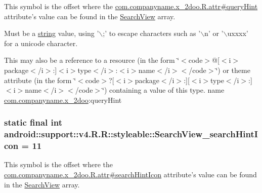 This symbol is the offset where the \hyperlink{classcom_1_1companyname_1_1x__2doo_1_1_r_1_1attr_2e0b0bcb94039ce843ad3c674a157a40}{com.companyname.x\_\-2doo.R.attr\#queryHint} attribute's value can be found in the \hyperlink{classandroid_1_1support_1_1v4_1_1_r_1_1styleable_63a589da97c59fb7eebd9759edb31f0d}{SearchView} array.

Must be a \hyperlink{classandroid_1_1support_1_1v4_1_1_r_1_1string}{string} value, using '$\backslash$;' to escape characters such as '$\backslash$n' or '$\backslash$uxxxx' for a unicode character. 

This may also be a reference to a resource (in the form \char`\"{}$<$code$>$@\mbox{[}$<$i$>$package$<$/i$>$:\mbox{]}$<$i$>$type$<$/i$>$:$<$i$>$name$<$/i$>$$<$/code$>$\char`\"{}) or theme attribute (in the form \char`\"{}$<$code$>$?\mbox{[}$<$i$>$package$<$/i$>$:\mbox{]}\mbox{[}$<$i$>$type$<$/i$>$:\mbox{]}$<$i$>$name$<$/i$>$$<$/code$>$\char`\"{}) containing a value of this type.  name \hyperlink{namespacecom_1_1companyname_1_1x__2doo}{com.companyname.x\_\-2doo}:queryHint \hypertarget{classandroid_1_1support_1_1v4_1_1_r_1_1styleable_4067485964152ef1a1eb4f8bf0d25188}{
\subsubsection[{SearchView\_\-searchHintIcon}]{\setlength{\rightskip}{0pt plus 5cm}static final int android::support::v4.R.R::styleable::SearchView\_\-searchHintIcon = 11}}
\label{classandroid_1_1support_1_1v4_1_1_r_1_1styleable_4067485964152ef1a1eb4f8bf0d25188}


This symbol is the offset where the \hyperlink{classcom_1_1companyname_1_1x__2doo_1_1_r_1_1attr_f26e67cf29775451a25cbddd198be891}{com.companyname.x\_\-2doo.R.attr\#searchHintIcon} attribute's value can be found in the \hyperlink{classandroid_1_1support_1_1v4_1_1_r_1_1styleable_63a589da97c59fb7eebd9759edb31f0d}{SearchView} array.


